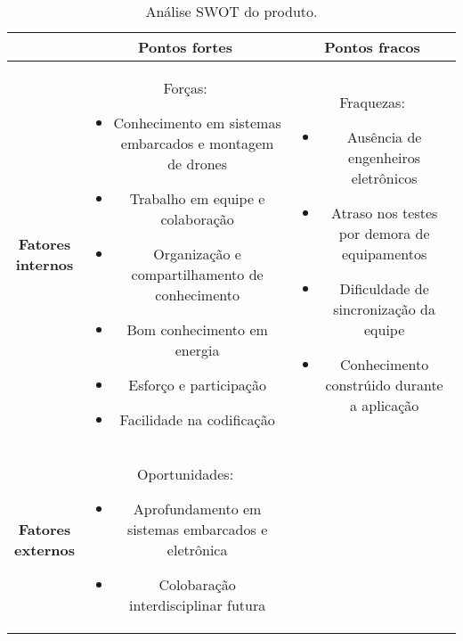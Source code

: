 \begin{table}[H]
\centering
\caption{Análise SWOT do produto.}
\begin{tabular}{|c|c|c|} \hline
 & \textbf{Pontos fortes} & \textbf{Pontos fracos}  \\ \hline 
    {\parbox{0.1\textwidth}{ \textbf{Fatores \\ internos}}}  &
    {\parbox{0.4\textwidth}{ Forças: 
        \\
        \begin{itemize}
            \item Conhecimento em sistemas embarcados e montagem de drones
            \item Trabalho em equipe e colaboração
			\item Organização e compartilhamento de conhecimento
			\item Bom conhecimento em energia
			\item Esforço e participação
			\item Facilidade na codificação
        \end{itemize} }} & 
    {\parbox{0.4\textwidth}{ Fraquezas:
        \\
        \begin{itemize}
            \item Ausência de engenheiros eletrônicos
            \item Atraso nos testes por demora de equipamentos
			\item Dificuldade de sincronização da equipe
			\item Conhecimento constrúido durante a aplicação
        \end{itemize} }}\\ \hline
    {\parbox{0.1\textwidth}{ \textbf{Fatores \\ externos}}}  &
    {\parbox{0.4\textwidth}{ Oportunidades:
        \\
        \begin{itemize}
            \item Aprofundamento em sistemas embarcados e eletrônica
            \item Colobaração interdisciplinar futura

\end{itemize}}}
\end{tabular}
\end{table}
